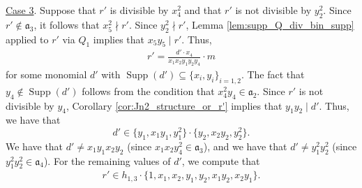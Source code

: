 \documentclass[12pt,a4paper]{amsart}
\theoremstyle{plain}
\theoremstyle{definition}
\theoremstyle{remark}
\def\a{\mathfrak{a}}
\DeclareMathOperator{\Supp}{Supp}
\newcommand{\ul}[1]{\underline{#1}}
\renewcommand{\subset}{\subseteq}
\begin{document}
\ul{Case 3}. Suppose that $r'$ is divisible by $x_{4}^{2}$ and that $r'$ is not divisible by $y_{2}^{2}$. Since $r' \notin \a_{3}$, it follows that $x_{5}^{2} \nmid r'$. Since $y_{2}^{2} \nmid r'$, Lemma \ref{lem:supp_Q_div_bin_supp} applied to $r'$ via $Q_{1}$ implies that $x_{5}y_{5} \mid r'$. Thus, 
\begin{align*}
    r' = \frac{d' \cdot x_{4}}{x_{1}x_{2}y_{1}y_{2}y_{4}} \cdot m
\end{align*}
for some monomial $d'$ with $\Supp(d') \subset \{ x_{i},y_{i} \}_{i=1,2}$. The fact that $y_{4} \notin \Supp(d')$ follows from the condition that $x_{4}^{2}y_{4} \in \a_{2}$. Since $r'$ is not divisible by $y_{4}$, Corollary \ref{cor:Jn2_structure_or_r'} implies that $y_{1}y_{2} \mid d'$. Thus, we have that
\begin{equation}
    \label{eqn:Jn2_supp_r_divisibility_d_prime_case_3}
    d' \in \{y_{1},x_{1}y_{1},y_{1}^{2}\} \cdot \{y_{2},x_{2}y_{2},y_{2}^{2}\}.
\end{equation}
We have that $d' \neq x_{1}y_{1}x_{2}y_{2}$ (since $x_{1}x_{2} y_{4}^{2} \in \a_{3}$), and we have that $d' \neq y_{1}^{2}y_{2}^{2}$ (since $y_{1}^{2}y_{2}^{2} \in \a_{4}$). For the remaining values of $d'$, we compute that
\begin{align*}
    r' \in h_{1,3} \cdot \{1,x_{1},x_{2},y_{1},y_{2},x_{1}y_{2},x_{2}y_{1}\}.
\end{align*}
\end{document}
